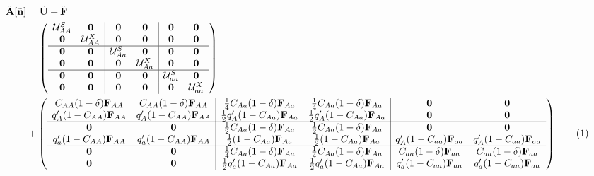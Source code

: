 \documentclass[11pt]{article}
\newcommand\numberthis{\addtocounter{equation}{1}\tag{\theequation}}
\def\mbf#1{\mathbf{#1}}
\def\mcal#1{\mathcal{#1}}
\begin{document}
{
\small
\begin{align*} \label{eq:AtildeCoexistence}
	\tilde{\mbf{A}}[\tilde{\mbf{n}}] &= \tilde{\mbf{U}} + \tilde{\mbf{F}}\\
		&= \left(
			\begin{array}{cc|cc|cc}
				\mcal{U}^S_{AA} & \mbf{0} & \mbf{0} & \mbf{0} & \mbf{0} & \mbf{0} \\ 
				\mbf{0} & \mcal{U}^X_{AA} & \mbf{0} & \mbf{0} & \mbf{0} & \mbf{0} \\\hline
				\mbf{0} & \mbf{0} & \mcal{U}^S_{Aa} & \mbf{0} & \mbf{0} & \mbf{0} \\
				\mbf{0} & \mbf{0} & \mbf{0} & \mcal{U}^X_{Aa} & \mbf{0} &  \mbf{0}\\\hline
				\mbf{0} & \mbf{0} & \mbf{0} & \mbf{0} & \mcal{U}^S_{aa} & \mbf{0} \\ 
				\mbf{0} & \mbf{0} & \mbf{0} & \mbf{0} & \mbf{0} & \mcal{U}^X_{aa}
			\end{array} \right) \\ 
		&+ \left(
			\begin{array}{cc|cc|cc}
				C_{AA} (1 - \delta) \mbf{F}_{AA} & C_{AA} (1 - \delta) \mbf{F}_{AA}  & \frac{1}{4} C_{Aa} (1 - \delta) \mbf{F}_{Aa} & \frac{1}{4} C_{Aa} (1 - \delta) \mbf{F}_{Aa} & \mbf{0} & \mbf{0} \\ 
				q^{\prime}_{A}  (1 - C_{AA}) \mbf{F}_{AA}& q^{\prime}_{A} (1 - C_{AA}) \mbf{F}_{AA} & \frac{1}{2} q^{\prime}_{A} (1 - C_{Aa})\mbf{F}_{Aa}  & \frac{1}{2} q^{\prime}_{A} (1 - C_{Aa})\mbf{F}_{Aa}  & \mbf{0} & \mbf{0} \\ \hline
				\mbf{0} & \mbf{0} & \frac{1}{2} C_{Aa} (1 - \delta) \mbf{F}_{Aa} & \frac{1}{2} C_{Aa} (1 - \delta) \mbf{F}_{Aa}& \mbf{0} & \mbf{0} \\
				q^{\prime}_{a} (1 - C_{AA}) \mbf{F}_{AA} & q^{\prime}_{a}(1 - C_{AA})  \mbf{F}_{AA} & \frac{1}{2}  (1 - C_{Aa}) \mbf{F}_{Aa}& \frac{1}{2} (1 - C_{Aa})\mbf{F}_{Aa} & q^{\prime}_{A} (1 - C_{aa})\mbf{F}_{aa}  & q^{\prime}_{A}  (1 - C_{aa})\mbf{F}_{aa}\\ \hline
				\mbf{0} & \mbf{0} & \frac{1}{4} C_{Aa} (1 - \delta) \mbf{F}_{Aa} & \frac{1}{4} C_{Aa} (1 - \delta) \mbf{F}_{Aa} & C_{aa} (1 - \delta) \mbf{F}_{aa} &  C_{aa} (1 - \delta) \mbf{F}_{aa}\\ 
				\mbf{0} & \mbf{0} & \frac{1}{2} q^{\prime}_{a}  (1 - C_{Aa}) \mbf{F}_{Aa} & \frac{1}{2} q^{\prime}_{a}  (1 - C_{Aa})\mbf{F}_{Aa}& q^{\prime}_{a}(1 - C_{aa})  \mbf{F}_{aa} & q^{\prime}_{a} (1 - C_{aa})\mbf{F}_{aa} 
			\end{array} \right) \numberthis
\end{align*}
}
\end{document}
